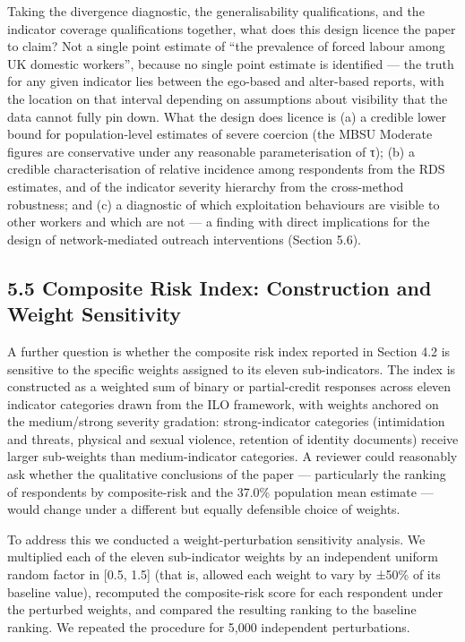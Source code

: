 \documentclass[
  12pt,
  letterpaper,
  DIV=11,
  numbers=noendperiod]{scrartcl}
\begin{document}
Taking the divergence diagnostic, the generalisability qualifications,
and the indicator coverage qualifications together, what does this
design licence the paper to claim? Not a single point estimate of ``the
prevalence of forced labour among UK domestic workers'', because no
single point estimate is identified --- the truth for any given
indicator lies between the ego-based and alter-based reports, with the
location on that interval depending on assumptions about visibility that
the data cannot fully pin down. What the design does licence is (a) a
credible lower bound for population-level estimates of severe coercion
(the MBSU Moderate figures are conservative under any reasonable
parameterisation of τ); (b) a credible characterisation of relative
incidence among respondents from the RDS estimates, and of the indicator
severity hierarchy from the cross-method robustness; and (c) a
diagnostic of which exploitation behaviours are visible to other workers
and which are not --- a finding with direct implications for the design
of network-mediated outreach interventions (Section 5.6).

\subsection{5.5 Composite Risk Index: Construction and Weight
Sensitivity}\label{composite-risk-index-construction-and-weight-sensitivity}

A further question is whether the composite risk index reported in
Section 4.2 is sensitive to the specific weights assigned to its eleven
sub-indicators. The index is constructed as a weighted sum of binary or
partial-credit responses across eleven indicator categories drawn from
the ILO framework, with weights anchored on the medium/strong severity
gradation: strong-indicator categories (intimidation and threats,
physical and sexual violence, retention of identity documents) receive
larger sub-weights than medium-indicator categories. A reviewer could
reasonably ask whether the qualitative conclusions of the paper ---
particularly the ranking of respondents by composite-risk and the 37.0\%
population mean estimate --- would change under a different but equally
defensible choice of weights.

To address this we conducted a weight-perturbation sensitivity analysis.
We multiplied each of the eleven sub-indicator weights by an independent
uniform random factor in {[}0.5, 1.5{]} (that is, allowed each weight to
vary by ±50\% of its baseline value), recomputed the composite-risk
score for each respondent under the perturbed weights, and compared the
resulting ranking to the baseline ranking. We repeated the procedure for
5,000 independent perturbations.
\end{document}

